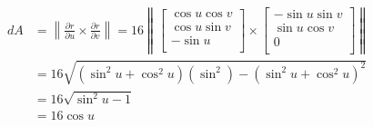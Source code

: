 \documentclass[a4paper, 11pt]{article}
\def\pp#1#2{\frac{\partial #1}{\partial #2}}
\begin{document}
\begin{enumerate}[label=(\alph*)]
\begin{itemize}
\begin{mdframed}
			            \begin{align*}
				            dA & =\left\|\pp ru\times \pp rv\right\|
				            = 16\left\|
				            \begin{bmatrix}
					            \cos u \cos v \\
					            \cos u \sin v \\
					            -\sin u       \\
				            \end{bmatrix}
				            \times
				            \begin{bmatrix}
					            -\sin u\sin v \\
					            \sin u\cos v  \\
					            0             \\
				            \end{bmatrix}
				            \right\|                                                        \\
				               & =16\sqrt{(\sin^2 u + \cos^2u)(\sin^2)-(\sin^2u+\cos^2u)^2} \\
				               & =16\sqrt{\sin^2u-1}                                        \\
				               & =16\cos u
			            \end{align*}



\end{mdframed}
\end{itemize}
\end{enumerate}
\end{document}

